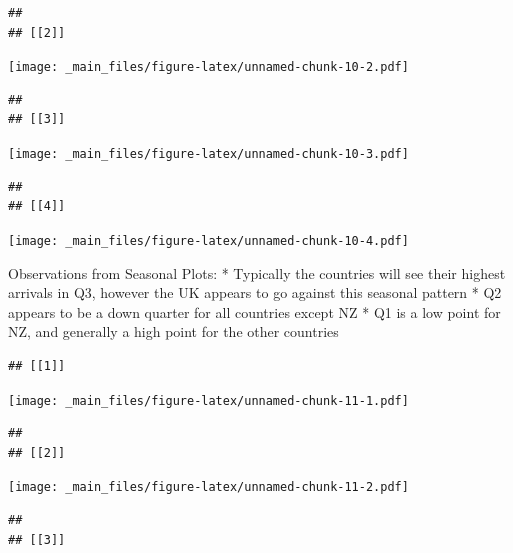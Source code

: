 \documentclass[]{book}
\newenvironment{Shaded}{\begin{snugshade}}{\end{snugshade}}
\newcommand{\ControlFlowTok}[1]{\textcolor[rgb]{0.13,0.29,0.53}{\textbf{#1}}}
\newcommand{\KeywordTok}[1]{\textcolor[rgb]{0.13,0.29,0.53}{\textbf{#1}}}
\newcommand{\NormalTok}[1]{#1}
\newcommand{\OperatorTok}[1]{\textcolor[rgb]{0.81,0.36,0.00}{\textbf{#1}}}
\newcommand{\StringTok}[1]{\textcolor[rgb]{0.31,0.60,0.02}{#1}}
\begin{document}
\begin{verbatim}
## 
## [[2]]
\end{verbatim}

\texttt{[image: \_main\_files/figure-latex/unnamed-chunk-10-2.pdf]}

\begin{verbatim}
## 
## [[3]]
\end{verbatim}

\texttt{[image: \_main\_files/figure-latex/unnamed-chunk-10-3.pdf]}

\begin{verbatim}
## 
## [[4]]
\end{verbatim}

\texttt{[image: \_main\_files/figure-latex/unnamed-chunk-10-4.pdf]}

Observations from Seasonal Plots:
* Typically the countries will see their highest arrivals in Q3, however the UK appears to go against this seasonal pattern
* Q2 appears to be a down quarter for all countries except NZ
* Q1 is a low point for NZ, and generally a high point for the other countries

\begin{Shaded}
\end{Shaded}

\begin{verbatim}
## [[1]]
\end{verbatim}

\texttt{[image: \_main\_files/figure-latex/unnamed-chunk-11-1.pdf]}

\begin{verbatim}
## 
## [[2]]
\end{verbatim}

\texttt{[image: \_main\_files/figure-latex/unnamed-chunk-11-2.pdf]}

\begin{verbatim}
## 
## [[3]]
\end{verbatim}
\end{document}
